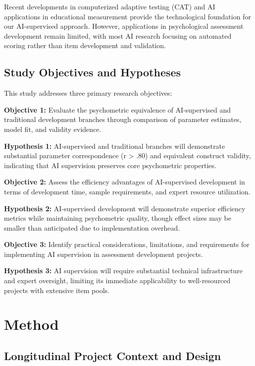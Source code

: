 \documentclass[12pt,a4paper]{article}
\begin{document}
Recent developments in computerized adaptive testing (CAT) \cite{Wainer2000, VanderLinden2010} and AI applications in educational measurement \cite{Williamson2006, VonDavier2017} provide the technological foundation for our AI-supervised approach. However, applications in psychological assessment development remain limited, with most AI research focusing on automated scoring \cite{Shermis2013} rather than item development and validation.

\subsection{Study Objectives and Hypotheses}

This study addresses three primary research objectives:

\textbf{Objective 1:} Evaluate the psychometric equivalence of AI-supervised and traditional development branches through comparison of parameter estimates, model fit, and validity evidence.

\textbf{Hypothesis 1:} AI-supervised and traditional branches will demonstrate substantial parameter correspondence (r > .80) and equivalent construct validity, indicating that AI supervision preserves core psychometric properties.

\textbf{Objective 2:} Assess the efficiency advantages of AI-supervised development in terms of development time, sample requirements, and expert resource utilization.

\textbf{Hypothesis 2:} AI-supervised development will demonstrate superior efficiency metrics while maintaining psychometric quality, though effect sizes may be smaller than anticipated due to implementation overhead.

\textbf{Objective 3:} Identify practical considerations, limitations, and requirements for implementing AI supervision in assessment development projects.

\textbf{Hypothesis 3:} AI supervision will require substantial technical infrastructure and expert oversight, limiting its immediate applicability to well-resourced projects with extensive item pools.

\section{Method}

\subsection{Longitudinal Project Context and Design}
\end{document}
